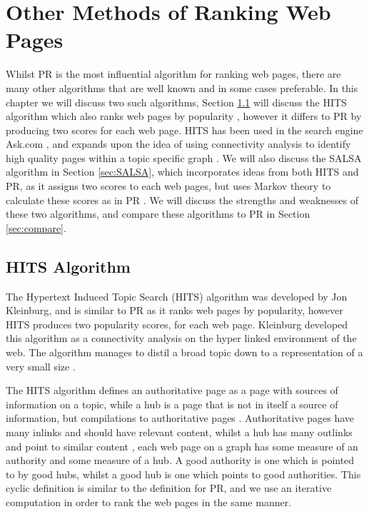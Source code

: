 \documentclass[11pt]{report}
\begin{document}
\chapter{Other Methods of Ranking Web Pages}\label{chap:Other}
Whilst PR is the most influential algorithm for ranking web pages, there are many other algorithms that are well known and in some cases preferable. In this chapter we will discuss two such algorithms, Section \ref{sec:HITS} will discuss the HITS algorithm which also ranks web pages by popularity \cite{kleinberg1999authoritative}, however it differs to PR by producing two scores for each web page. HITS has been used in the search engine Ask.com \cite{bonato}, and expands upon the idea of using connectivity analysis to identify high quality pages within a topic specific graph \cite{manning}. We will also discuss the SALSA algorithm in Section \ref{sec:SALSA}, which incorporates ideas from both HITS and PR, as it assigns two scores to each web pages, but uses Markov theory to calculate these scores as in PR \cite{lempel2000stochastic}. We will discuss the strengths and weaknesses of these two algorithms, and compare these algorithms to PR in Section \ref{sec:compare}.

\section{HITS Algorithm} \label{sec:HITS}
The Hypertext Induced Topic Search (HITS) algorithm was developed by Jon Kleinburg, and is similar to PR as it ranks web pages by popularity, however HITS produces two popularity scores, for each web page.  Kleinburg developed this algorithm as a connectivity analysis on the hyper linked environment of the web. The algorithm manages to distil a broad topic down to a representation of a very small size \cite{kleinberg1999authoritative}. 

The HITS algorithm defines an authoritative page as a page with sources of information on a topic, while a hub is a page that is not in itself a source of information, but compilations to authoritative pages \cite{manning}. Authoritative pages have many inlinks and should have relevant content, whilst a hub has many outlinks and point to similar content \cite{baeza1999modern}, each web page on a graph has some measure of an authority and some measure of a hub. A good authority is one which is pointed to by good hubs, whilst a good hub is one which points to good authorities. This cyclic definition is similar to the definition for PR, and we use an iterative computation in order to rank the web pages in the same manner.
\end{document}
